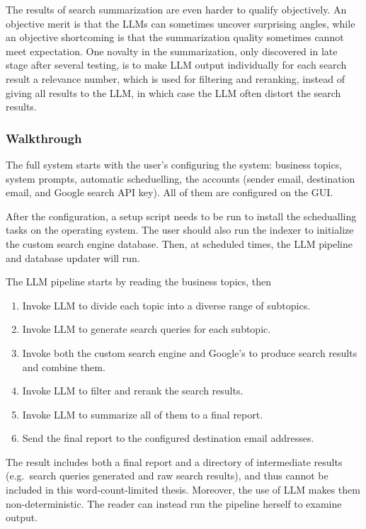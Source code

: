 \documentclass[final-report]{report-template}
\begin{document}
The results of search summarization are even harder to qualify objectively. An
objective merit is that the LLMs can sometimes uncover surprising angles, while
an objective shortcoming is that the summarization quality sometimes cannot
meet expectation. One novalty in the summarization, only discovered in late
stage after several testing, is to make LLM output individually for each search
result a relevance number, which is used for filtering and reranking, instead
of giving all results to the LLM, in which case the LLM often distort the
search results.

\subsubsection{Walkthrough}
The full system starts with the user's configuring the system: business topics,
system prompts, automatic scheduelling, the accounts (sender email, destination
email, and Google search API key). All of them are configured on the GUI.

After the configuration, a setup script needs to be run to install the
schedualling tasks on the operating system. The user should also run the
indexer to initialize the custom search engine database. Then, at scheduled
times, the LLM pipeline and database updater will run.

The LLM pipeline starts by reading the business topics, then
\begin{enumerate}
	\item Invoke LLM to divide each topic into a diverse range of subtopics.
	\item Invoke LLM to generate search queries for each subtopic.
	\item Invoke both the custom search engine and Google's to produce search
		results and combine them.
	\item Invoke LLM to filter and rerank the search results.
	\item Invoke LLM to summarize all of them to a final report.
	\item Send the final report to the configured destination email addresses.
\end{enumerate}

The result includes both a final report and a directory of intermediate results
(e.g.\ search queries generated and raw search results), and thus cannot be
included in this word-count-limited thesis. Moreover, the use of LLM makes them
non-deterministic. The reader can instead run the pipeline herself to examine
output.
\end{document}
